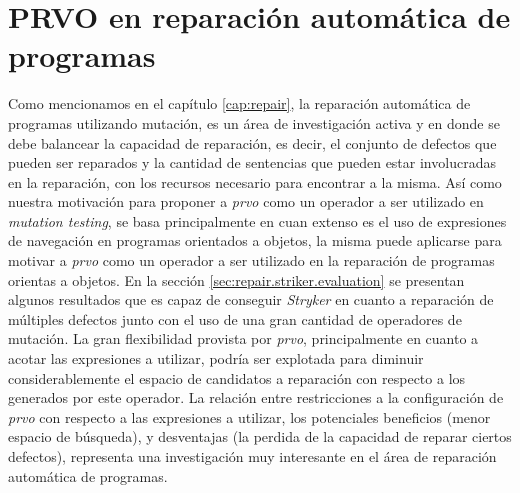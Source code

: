 \section{PRVO en reparaci\'on autom\'atica de programas}

Como mencionamos en el cap\'itulo \ref{cap:repair}, la reparaci\'on autom\'atica de programas utilizando mutaci\'on, es un \'area de investigaci\'on activa y en donde se debe balancear la capacidad de reparaci\'on, es decir, el conjunto de defectos que pueden ser reparados y la cantidad de sentencias que pueden estar involucradas en la reparaci\'on, con los recursos necesario para encontrar a la misma. As\'i como nuestra motivaci\'on para proponer a \emph{prvo} como un operador a ser utilizado en \emph{mutation testing}, se basa principalmente en cuan extenso es el uso de expresiones de navegaci\'on en programas orientados a objetos, la misma puede aplicarse para motivar a \emph{prvo} como un operador a ser utilizado en la reparaci\'on de programas orientas a objetos. En la secci\'on \ref{sec:repair.striker.evaluation} se presentan algunos resultados que es capaz de conseguir \emph{Stryker} en cuanto a reparaci\'on de m\'ultiples defectos junto con el uso de una gran cantidad de operadores de mutaci\'on. La gran flexibilidad provista por \emph{prvo}, principalmente en cuanto a acotar las expresiones a utilizar, podr\'ia ser explotada para diminuir considerablemente el espacio de candidatos a reparaci\'on con respecto a los generados por este operador. La relaci\'on entre restricciones a la configuraci\'on de \emph{prvo} con respecto a las expresiones a utilizar, los potenciales beneficios (menor espacio de b\'usqueda), y desventajas (la perdida de la capacidad de reparar ciertos defectos), representa una investigaci\'on muy interesante en el \'area de reparaci\'on autom\'atica de programas.

